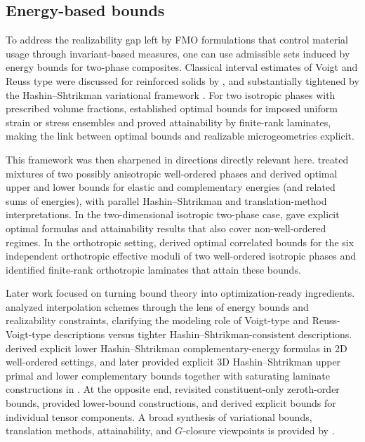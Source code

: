 \documentclass[preprint,3p]{elsarticle}
\begin{document}
\subsection{Energy-based bounds}\label{sec:intro_bounds}
To address the realizability gap left by FMO formulations that control material usage through invariant-based measures, one can use admissible sets induced by energy bounds for two-phase composites. Classical interval estimates of Voigt and Reuss type were discussed for reinforced solids by \citet{Hill1963}, and substantially tightened by the Hashin--Shtrikman variational framework \citep{Hashin1963}. For two isotropic phases with prescribed volume fractions, \citet{Avellaneda1987} established optimal bounds for imposed uniform strain or stress ensembles and proved attainability by finite-rank laminates, making the link between optimal bounds and realizable microgeometries explicit.

This framework was then sharpened in directions directly relevant here. \citet{Allaire1993wo} treated mixtures of two possibly anisotropic well-ordered phases and derived optimal upper and lower bounds for elastic and complementary energies (and related sums of energies), with parallel Hashin--Shtrikman and translation-method interpretations. In the two-dimensional isotropic two-phase case, \citet{Allaire1993} gave explicit optimal formulas and attainability results that also cover non-well-ordered regimes. In the orthotropic setting, \citet{Lipton1994} derived optimal correlated bounds for the six independent orthotropic effective moduli of two well-ordered isotropic phases and identified finite-rank orthotropic laminates that attain these bounds.

Later work focused on turning bound theory into optimization-ready ingredients. \citet{Bendsoe1999} analyzed interpolation schemes through the lens of energy bounds and realizability constraints, clarifying the modeling role of Voigt-type and Reuss-Voigt-type descriptions versus tighter Hashin--Shtrikman-consistent descriptions. \citet{Burazin2021} derived explicit lower Hashin--Shtrikman complementary-energy formulas in 2D well-ordered settings, and later provided explicit 3D Hashin--Shtrikman upper primal and lower complementary bounds together with saturating laminate constructions in \citep{Burazin2024}. At the opposite end, \citet{Lobos2016} revisited constituent-only zeroth-order bounds, provided lower-bound constructions, and derived explicit bounds for individual tensor components. A broad synthesis of variational bounds, translation methods, attainability, and $G$-closure viewpoints is provided by \citet{Milton2022}.
\end{document}
